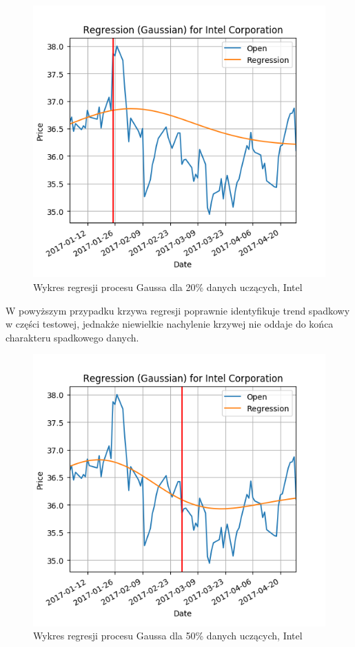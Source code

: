 \begin{figure}[ht]
\centering
\includegraphics[scale=0.4]{pictures/plots/intel_gpr_20.png}
\caption{Wykres regresji procesu Gaussa dla 20\% danych uczących, Intel}
\label{fig:intel_gpr_20}
\end{figure}

W powyższym przypadku krzywa regresji poprawnie identyfikuje trend spadkowy w części testowej, jednakże niewielkie nachylenie krzywej nie oddaje do końca charakteru spadkowego danych.\\ 

\begin{figure}[ht]
\centering
\includegraphics[scale=0.4]{pictures/plots/intel_gpr_50.png}
\caption{Wykres regresji procesu Gaussa dla 50\% danych uczących, Intel}
\label{fig:intel_gpr_50}
\end{figure}


